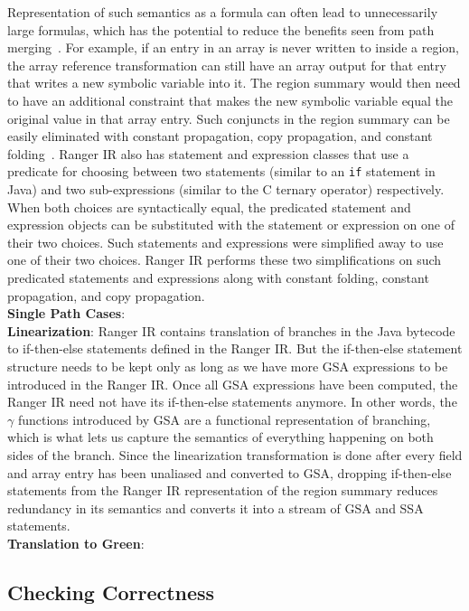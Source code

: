 %
Representation of such semantics as a formula can often lead to unnecessarily large formulas, which has the potential to
reduce the benefits seen from path merging~\cite{angr}.
%
For example, if an entry in an array is never written to inside a region, the array reference transformation can still have an
array output for that entry that writes a new symbolic variable into it.
%
The region summary would then need to have an additional constraint that makes the new symbolic variable equal the
original value in that array entry.
%
Such conjuncts in the region summary can be easily eliminated with constant propagation, copy propagation, and constant
folding~\cite{dragon-book}.
%
Ranger IR also has statement and expression classes that use a predicate for choosing between two statements (similar to
an {\tt if} statement in Java) and two sub-expressions (similar to the C ternary operator) respectively.
%
When both choices are syntactically equal, the predicated statement and expression objects can be substituted with the
statement or expression on one of their two choices.
%
Such statements and expressions were simplified away to use one of their two choices.
%
Ranger IR performs these two simplifications on such predicated statements and expressions along with constant folding,
constant propagation, and copy propagation.\\
\textbf{Single Path Cases}: \\
\textbf{Linearization}: 
Ranger IR contains translation of branches in the Java bytecode to if-then-else statements defined in the Ranger IR.
%
But the if-then-else statement structure needs to be kept only as long as we have more GSA expressions to be
introduced in the Ranger IR.
%
Once all GSA expressions have been computed, the Ranger IR need not have its if-then-else statements anymore.
%
In other words, the $\gamma$ functions introduced by GSA are a functional representation of branching, which is what lets us
capture the semantics of everything happening on both sides of the branch.
%
Since the linearization transformation is done after every field and array entry has been unaliased and converted to
GSA, dropping if-then-else statements from the Ranger IR representation of the region summary reduces redundancy in its
semantics and converts it into a stream of GSA and SSA statements.\\
\textbf{Translation to Green}: \\

\subsection{Checking Correctness}

